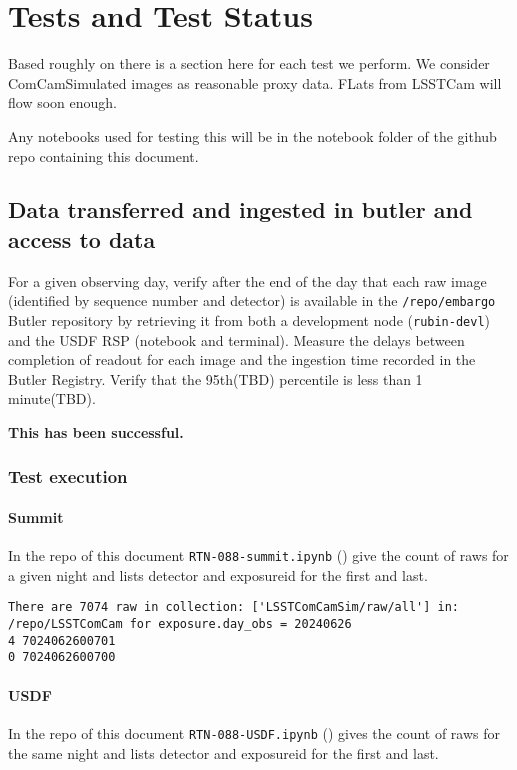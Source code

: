 \section{Tests and Test Status} \label{sec:testing}
Based roughly on  there is a section here for each test we perform.
We consider ComCamSimulated images as reasonable proxy data.
FLats from LSSTCam will flow soon enough.

Any notebooks used for testing this will be in the notebook folder of the github repo containing this document.

\subsection{Data transferred and ingested in butler and access to data}
For a given observing day, verify after the end of the day that each raw image (identified by sequence number and detector) is available in the \texttt{/repo/embargo} Butler repository by retrieving it from both a development node (\texttt{rubin-devl}) and the USDF RSP (notebook and terminal).
Measure the delays between completion of readout for each image and the ingestion time recorded in the Butler Registry.
Verify that the 95th(TBD) percentile is less than 1 minute(TBD).

\textbf{This has been successful.}

\subsubsection{Test execution}
\paragraph{Summit}
In the repo of this document \texttt{RTN-088-summit.ipynb} () give the count of raws for a given night and lists detector and exposureid for the first and last.

\begin{lstlisting}
There are 7074 raw in collection: ['LSSTComCamSim/raw/all'] in: /repo/LSSTComCam for exposure.day_obs = 20240626
4 7024062600701
0 7024062600700
\end{lstlisting}

\paragraph{USDF}
In the repo of this document \texttt{RTN-088-USDF.ipynb} () gives the count of raws for the same night and lists detector and exposureid for the first and last.

